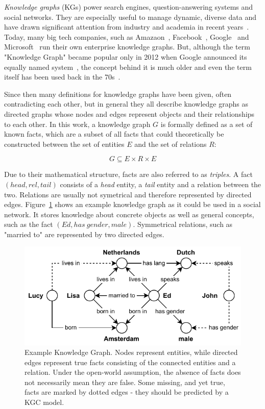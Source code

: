 \emph{Knowledge graphs} (KGs) power search engines, question-answering systems and social networks. They are especially useful to manage dynamic, diverse data and have drawn significant attention from industry and academia in recent years~\cite{}. Today, many big tech companies, such as Amazaon~\cite{AmazonKG}, Facebook~\cite{}, Google~\cite{} and Microsoft~\cite{MicrosoftKG} run their own enterprise knowledge graphs. But, although the term "Knowledge Graph" became popular only in 2012 when Google announced its equally named system~\cite{}, the concept behind it is much older and even the term itself has been used back in the 70s~\cite{}.

Since then many definitions for knowledge graphs have been given, often contradicting each other, but in general they all describe knowledge graphs as directed graphs whose nodes and edges represent objects and their relationships to each other. In this work, a knowledge graph $G$ is formally defined as a set of known facts, which are a subset of all facts that could theoretically be constructed between the set of entities $E$ and the set of relations $R$:

\[
    G \subseteq E \times R \times E
\]

Due to their mathematical structure, facts are also referred to as \emph{triples}. A fact $(head, rel, tail)$ consists of a \emph{head} entity, a \emph{tail} entity and a relation between the two. Relations are usually not symetrical and therefore represented by directed edges. Figure~\ref{fig:1_introduction/knowledge_graph} shows an example knowledge graph as it could be used in a social network. It stores knowledge about concrete objects as well as general concepts, such as the fact $(Ed, has~gender, male)$. Symmetrical relations, such as "married to" are represented by two directed edges.

\begin{figure}[t]
    \centering
    \includegraphics[]{1_introduction/knowledge_graph}
    \caption{Example Knowledge Graph. Nodes represent entities, while directed edges represent true facts consisting of the connected entities and a relation. Under the open-world assumption, the absence of facts does not necessarily mean they are false. Some missing, and yet true, facts are marked by dotted edges - they should be predicted by a KGC model.}
    \label{fig:1_introduction/knowledge_graph}
\end{figure}

